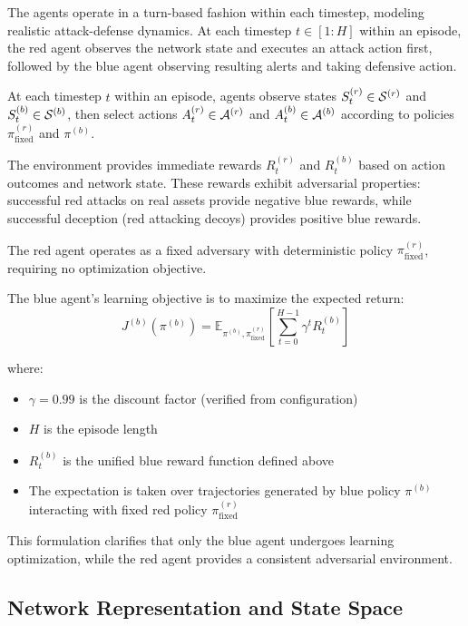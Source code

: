 \documentclass[12pt]{article}
\theoremstyle{definition}
\theoremstyle{plain}
\begin{document}
The agents operate in a turn-based fashion within each timestep, modeling realistic attack-defense dynamics. At each timestep $t \in [1:H]$ within an episode, the red agent observes the network state and executes an attack action first, followed by the blue agent observing resulting alerts and taking defensive action.

At each timestep $t$ within an episode, agents observe states $S_t^{(r)} \in \mathcal{S}^{(r)}$ and $S_t^{(b)} \in \mathcal{S}^{(b)}$, then select actions $A_t^{(r)} \in \mathcal{A}^{(r)}$ and $A_t^{(b)} \in \mathcal{A}^{(b)}$ according to policies $\pi^{(r)}_{\text{fixed}}$ and $\pi^{(b)}$.

The environment provides immediate rewards $R_t^{(r)}$ and $R_t^{(b)}$ based on action outcomes and network state. These rewards exhibit adversarial properties: successful red attacks on real assets provide negative blue rewards, while successful deception (red attacking decoys) provides positive blue rewards.

The red agent operates as a fixed adversary with deterministic policy $\pi^{(r)}_{\text{fixed}}$, requiring no optimization objective.

The blue agent's learning objective is to maximize the expected return:
\begin{equation}
J^{(b)}(\pi^{(b)}) = \mathbb{E}_{\pi^{(b)}, \pi^{(r)}_{\text{fixed}}}\left[\sum_{t=0}^{H-1} \gamma^t R_t^{(b)}\right]
\end{equation}

where:
\begin{itemize}
\item $\gamma = 0.99$ is the discount factor (verified from configuration)
\item $H$ is the episode length 
\item $R_t^{(b)}$ is the unified blue reward function defined above
\item The expectation is taken over trajectories generated by blue policy $\pi^{(b)}$ interacting with fixed red policy $\pi^{(r)}_{\text{fixed}}$
\end{itemize}

This formulation clarifies that only the blue agent undergoes learning optimization, while the red agent provides a consistent adversarial environment.

\subsection{Network Representation and State Space}
\end{document}
